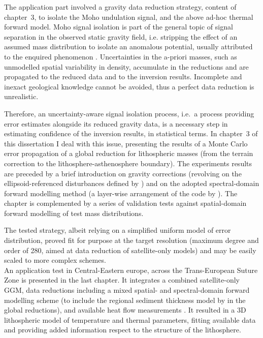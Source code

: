 The application part involved a gravity data reduction strategy, content of chapter~3, to isolate the Moho undulation signal, and the above ad-hoc thermal forward model.
Moho signal isolation is part of the general topic of signal separation in the observed static gravity field, i.e. stripping the effect of an assumed mass distribution to isolate an anomalous potential, usually attributed to the enquired phenomenon \parencites{Mikuska2007}{Sjoberg2013}{Aitken2015}[][, to name a few]{Tenzer2019}.
Uncertainties in the a-priori masses, such as unmodelled spatial variability in density, accumulate in the reductions and are propagated to the reduced data and to the inversion results.
Incomplete and inexact geological knowledge cannot be avoided, thus a perfect data reduction is unrealistic.

Therefore, an uncertainty-aware signal isolation process, i.e.~a process providing error estimates alongside its reduced gravity data, is a necessary step in estimating confidence of the inversion results, in statistical terms.
In chapter~3 of this dissertation I deal with this issue, presenting the results of a Monte Carlo error propagation \parencite{Aster2018} of a global reduction for lithospheric masses (from the terrain correction to the lithosphere-asthenosphere boundary).
The experiments results are preceded by a brief introduction on gravity corrections (revolving on the ellipsoid-referenced disturbances defined by \cite{Vajda2008}) and on the adopted spectral-domain forward modelling method (a layer-wise arrangement of the code by \cite{Wieczorek2018}).
The chapter is complemented by a series of validation tests against spatial-domain forward modelling of test mass distributions.

The tested strategy, albeit relying on a simplified uniform model of error distribution, proved fit for purpose at the target resolution (maximum degree and order of 280, aimed at data reduction of satellite-only models) and may be easily scaled to more complex schemes.
\\

An application test in Central-Eastern europe, across the Trans-European Suture Zone is presented in the last chapter.
It integrates a combined satellite-only GGM, data reductions including a mixed spatial- and spectral-domain forward modelling scheme (to include the regional sediment thickness model by \cite{EuCRUST07} in the global reductions), and available heat flow measurements \parencite{globalHF}.
It resulted in a 3D lithospheric model of temperature and thermal parameters, fitting available data and providing added information respect to the structure of the lithosphere.

